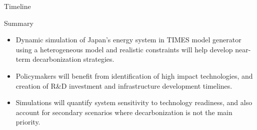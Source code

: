 \documentclass[final]{beamer}
\newlength{\onecolwid}
\newlength{\twocolwid}
\newlength{\threecolwid}
\begin{document}
\begin{frame}[t]
\begin{columns}[t,totalwidth=\threecolwid]
\begin{column}{\onecolwid}
\begin{block}{Timeline}
        
\end{block}




\begin{block}{Summary}
\begin{itemize}

\item Dynamic simulation of Japan's energy system in TIMES model generator using a heterogeneous model and realistic constraints will help develop near-term decarbonization strategies.

\item Policymakers will benefit from identification of high impact technologies, and creation of R\&D investment and infrastructure development timelines.

\item Simulations will quantify system sensitivity to technology readiness, and also account for secondary scenarios where decarbonization is not the main priority.

\end{itemize}

\end{block}



\end{column} %

\end{columns} %

\begin{columns}[t,totalwidth=\threecolwid] %

\begin{column}{\twocolwid} %


\end{column}
\end{columns}
\end{frame}
\end{document}
